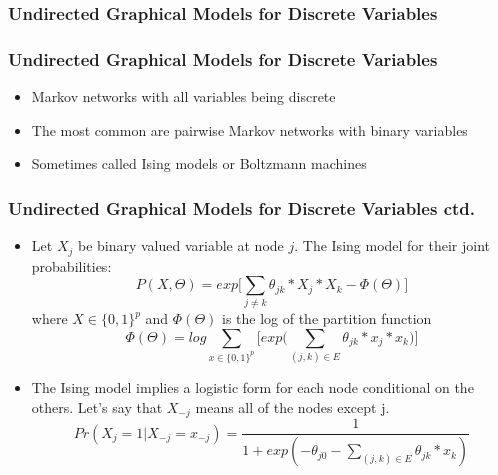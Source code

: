\documentclass{beamer}
\begin{document}
\begin{frame}
\frametitle{Undirected Graphical Models for Discrete Variables}
\end{frame}

\begin{frame}
\frametitle{Undirected Graphical Models for Discrete Variables}
\begin{itemize}
\item Markov networks with all variables being discrete
\item The most common are pairwise Markov networks with binary variables
\item Sometimes called Ising models or Boltzmann machines
\end{itemize}
\end{frame}

\begin{frame}
\frametitle{Undirected Graphical Models for Discrete Variables ctd.}
\begin{itemize}
\item Let $X_j$ be binary valued variable at node $j$. The Ising model for their joint  probabilities:
\begin{equation}
P(X, \Theta) = exp\Big[\sum_{j \neq k} \theta_{jk} * X_j * X_k - \Phi(\Theta)\Big]
\end{equation}
where $X \in \{0, 1\}^p$ and $\Phi(\Theta)$ is the log of the partition function
\begin{equation}
\Phi(\Theta)=log \sum_{x \in \{0, 1\}^p} \Big[exp \Big( \sum_{(j, k) \in E} \theta_{jk} * x_j * x_k \Big) \Big] 
\end{equation}
\item The Ising model implies a logistic form for each node conditional on the others. Let's say that $X_{-j}$ means all of the nodes except j.
\begin{equation}
Pr(X_j=1 | X_{-j}=x_{-j})=\frac{1}{1 + exp(-\theta_{j0} - \sum_{(j, k) \in E} \theta_{jk} * x_k)}
\end{equation}
\end{itemize}
\end{frame}
\end{document}
